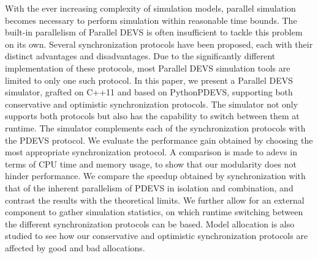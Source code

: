 With the ever increasing complexity of simulation models, parallel simulation becomes necessary to perform simulation within reasonable time bounds.
The built-in parallelism of Parallel DEVS is often insufficient to tackle this problem on its own.
Several synchronization protocols have been proposed, each with their distinct advantages and disadvantages.
Due to the significantly different implementation of these protocols, most Parallel DEVS simulation tools are limited to only one such protocol.
In this paper, we present a Parallel DEVS simulator, grafted on C++11 and based on PythonPDEVS, supporting both conservative and optimistic synchronization protocols.
The simulator not only supports both protocols but also has the capability to switch between them at runtime.
The simulator complements each of the synchronization protocols with the PDEVS protocol.
We evaluate the performance gain obtained by choosing the most appropriate synchronization protocol.
A comparison is made to adevs in terms of CPU time and memory usage, to show that our modularity does not hinder performance.
We compare the speedup obtained by synchronization with that of the inherent parallelism of PDEVS in isolation and combination, and contrast the results with the theoretical limits.
We further allow for an external component to gather simulation statistics, on which runtime switching between the different synchronization protocols can be based.
Model allocation is also studied to see how our conservative and optimistic synchronization protocols are affected by good and bad allocations.
